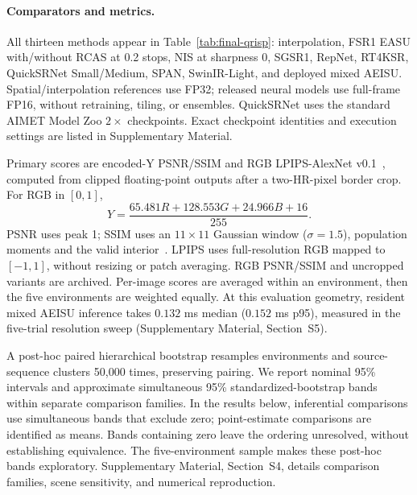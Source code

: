 \documentclass[10pt,twocolumn,letterpaper]{article}
\newcommand{\model}{AEISU}
\begin{document}
\paragraph{Comparators and metrics.}
All thirteen methods appear in Table~\ref{tab:final-qrisp}: interpolation, FSR1 EASU with/without RCAS at 0.2 stops, NIS at sharpness 0, SGSR1, RepNet, RT4KSR, QuickSRNet Small/Medium, SPAN, SwinIR-Light, and deployed mixed \model{}.
Spatial/interpolation references use FP32; released neural models use full-frame FP16, without retraining, tiling, or ensembles.
QuickSRNet uses the standard AIMET Model Zoo $2\times$ checkpoints.
Exact checkpoint identities and execution settings are listed in Supplementary Material.

Primary scores are encoded-Y PSNR/SSIM and RGB LPIPS-AlexNet v0.1~\cite{zhang2018lpips}, computed from clipped floating-point outputs after a two-HR-pixel border crop.
For RGB in $[0,1]$,
\begin{equation}
 Y=\frac{65.481R+128.553G+24.966B+16}{255}.
 \label{eq:luma-eval}
\end{equation}
PSNR uses peak 1; SSIM uses an $11\times11$ Gaussian window ($\sigma=1.5$), population moments and the valid interior~\cite{basicsrmetrics,wang2004ssim}.
LPIPS uses full-resolution RGB mapped to $[-1,1]$, without resizing or patch averaging.
RGB PSNR/SSIM and uncropped variants are archived.
Per-image scores are averaged within an environment, then the five environments are weighted equally.
At this evaluation geometry, resident mixed \model{} inference takes $0.132$ ms median ($0.152$ ms p95), measured in the five-trial resolution sweep (Supplementary Material, Section~S5).

A post-hoc paired hierarchical bootstrap resamples environments and source-sequence clusters 50,000 times, preserving pairing.
We report nominal 95\% intervals and approximate simultaneous 95\% standardized-bootstrap bands within separate comparison families.
In the results below, inferential comparisons use simultaneous bands that exclude zero; point-estimate comparisons are identified as means.
Bands containing zero leave the ordering unresolved, without establishing equivalence.
The five-environment sample makes these post-hoc bands exploratory.
Supplementary Material, Section~S4, details comparison families, scene sensitivity, and numerical reproduction.
\end{document}
